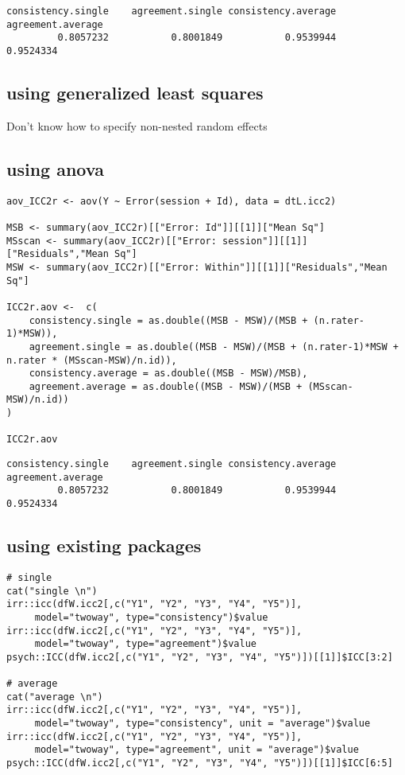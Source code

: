\documentclass{article}
\begin{document}
\begin{verbatim}
consistency.single    agreement.single consistency.average   agreement.average 
         0.8057232           0.8001849           0.9539944           0.9524334
\end{verbatim}

\clearpage

\subsection{using generalized least squares}
\label{sec:org12779b1}
Don't know how to specify non-nested random effects

\subsection{using anova}
\label{sec:orgca469b2}
\lstset{language=r,label= ,caption= ,captionpos=b,numbers=none}
\begin{lstlisting}
aov_ICC2r <- aov(Y ~ Error(session + Id), data = dtL.icc2) 

MSB <- summary(aov_ICC2r)[["Error: Id"]][[1]]["Mean Sq"]
MSscan <- summary(aov_ICC2r)[["Error: session"]][[1]]["Residuals","Mean Sq"]
MSW <- summary(aov_ICC2r)[["Error: Within"]][[1]]["Residuals","Mean Sq"]

ICC2r.aov <-  c(
    consistency.single = as.double((MSB - MSW)/(MSB + (n.rater-1)*MSW)),
    agreement.single = as.double((MSB - MSW)/(MSB + (n.rater-1)*MSW + n.rater * (MSscan-MSW)/n.id)),
    consistency.average = as.double((MSB - MSW)/MSB),
    agreement.average = as.double((MSB - MSW)/(MSB + (MSscan-MSW)/n.id))
)

ICC2r.aov
\end{lstlisting}

\begin{verbatim}
consistency.single    agreement.single consistency.average   agreement.average 
         0.8057232           0.8001849           0.9539944           0.9524334
\end{verbatim}

\subsection{using existing packages}
\label{sec:org2880b8e}
\lstset{language=r,label= ,caption= ,captionpos=b,numbers=none}
\begin{lstlisting}
# single
cat("single \n")
irr::icc(dfW.icc2[,c("Y1", "Y2", "Y3", "Y4", "Y5")],
	 model="twoway", type="consistency")$value
irr::icc(dfW.icc2[,c("Y1", "Y2", "Y3", "Y4", "Y5")],
	 model="twoway", type="agreement")$value
psych::ICC(dfW.icc2[,c("Y1", "Y2", "Y3", "Y4", "Y5")])[[1]]$ICC[3:2]

# average
cat("average \n")
irr::icc(dfW.icc2[,c("Y1", "Y2", "Y3", "Y4", "Y5")],
	 model="twoway", type="consistency", unit = "average")$value
irr::icc(dfW.icc2[,c("Y1", "Y2", "Y3", "Y4", "Y5")],
	 model="twoway", type="agreement", unit = "average")$value
psych::ICC(dfW.icc2[,c("Y1", "Y2", "Y3", "Y4", "Y5")])[[1]]$ICC[6:5]
\end{lstlisting}
\end{document}
